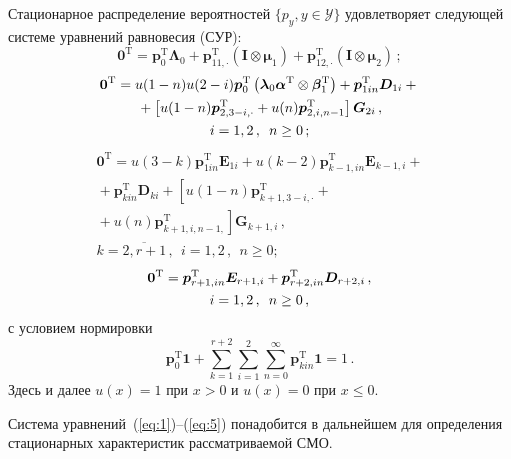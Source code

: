 \begin{multicols}{2}
Стационарное распределение вероятностей $\{p_y, y\in\mathcal{Y}\}$ удовлетворяет следующей системе 
уравнений равновесия (СУР):
\begin{equation}
\label{eq:1}
\boldsymbol{0}^{\mathrm{T}}=\boldsymbol{p}_0^{\mathrm{T}} \boldsymbol{\Lambda}_0+
\boldsymbol{p}_{11,\cdot}^{\mathrm{T}}\left(
\boldsymbol{I}\otimes\boldsymbol{\mu}_1\right) + \boldsymbol{p}_{12,\cdot}^{\mathrm{T}}\left(\boldsymbol{I}\otimes \boldsymbol{\mu}_2\right)\,;
\end{equation}
\begin{multline}
\boldsymbol{0}^{\mathrm{T}}=u(1-n)u(2-i)\boldsymbol{p}_0^{\mathrm{T}} \left(\boldsymbol{\lambda}_0\boldsymbol{\alpha}^{\mathrm{T}} \otimes\boldsymbol{\beta}_1^{\mathrm{T}}\right)+\boldsymbol{p}_{1in}^{\mathrm{T}}\boldsymbol{D}_{1i}+{}\\
{}+\left[u(1-n)\boldsymbol{p}^{\mathrm{T}}_{2,3-i,\cdot}+ u(n)\boldsymbol{p}^{\mathrm{T}}_{2,i,n-1}\right]
\boldsymbol{G}_{2i}\,,\\
 i=1,2\,,\enskip n\geq 0\,;
\label{eq:2}
\end{multline}
\begin{multline}
\label{eq:3}
\boldsymbol{0}^{\mathrm{T}}=u(3-k)\boldsymbol{p}_{1in}^{\mathrm{T}}\boldsymbol{E}_{1i}+
u(k-2)\boldsymbol{p}_{k-1,in}^{\mathrm{T}}\boldsymbol{E}_{k-1,i}+{}\\
{}+\boldsymbol{p}_{kin}^{\mathrm{T}}\boldsymbol{D}_{ki}+
\left[u(1-n)\boldsymbol{p}_{k+1,3-i,\cdot}^{\mathrm{T}}+{}\right.\\
{}+\left. u(n)\boldsymbol{p}_{k+1,i,n-1,}^{\mathrm{T}}\right]\boldsymbol{G}_{k+1,i}\,,\\
k=\overline{2,r+1}\,,\ \  i=1,2\,,\ \ n\geq 0;
\end{multline}
\begin{multline}
\label{eq:4}
\boldsymbol{0}^{\mathrm{T}}=\boldsymbol{p}_{r+1,in}^{\mathrm{T}}\boldsymbol{E}_{r+1,i}+
\boldsymbol{p}_{r+2,in}^{\mathrm{T}}\boldsymbol{D}_{r+2,i}\,,\\ i=1,2\,,\enskip n\geq 0\,,
\end{multline}
с условием нормировки
\begin{equation}
\label{eq:5}
\boldsymbol{p}_0^{\mathrm{T}}\boldsymbol{1}+
\sum\limits_{k=1}^{r+2}\sum\limits_{i=1}^2\sum\limits_{n=0}^{\infty}
\boldsymbol{p}_{kin}^{\mathrm{T}}\boldsymbol{1}=1\,.
\end{equation}
Здесь и далее $u(x)=1$ при $x>0$ и $u(x)=0$ при $x\leq 0$.

Система уравнений~(\ref{eq:1})--(\ref{eq:5}) понадобится в дальнейшем для определения 
стационарных характеристик рассматриваемой СМО.


\end{multicols}
